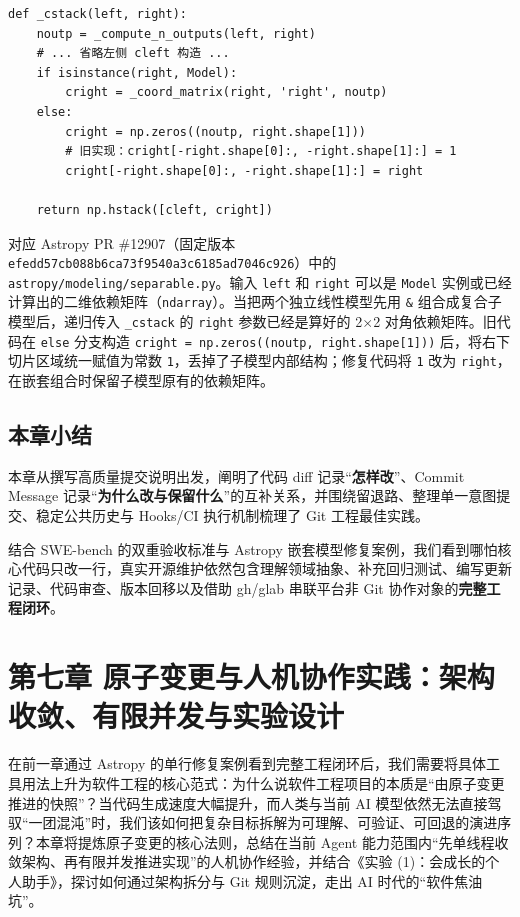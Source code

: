 \documentclass[UTF8,a4paper,11pt,fontset=fandol]{ctexart}
\begin{document}
\begin{lstlisting}[basicstyle={\ttfamily\small\linespread{1}\selectfont},captionpos=t,caption={Astropy 嵌套复合模型依赖矩阵修复对比（PR \#12907）}]
def _cstack(left, right):
    noutp = _compute_n_outputs(left, right)
    # ... 省略左侧 cleft 构造 ...
    if isinstance(right, Model):
        cright = _coord_matrix(right, 'right', noutp)
    else:
        cright = np.zeros((noutp, right.shape[1]))
        # 旧实现：cright[-right.shape[0]:, -right.shape[1]:] = 1
        cright[-right.shape[0]:, -right.shape[1]:] = right

    return np.hstack([cleft, cright])
\end{lstlisting}

对应 Astropy PR \#12907（固定版本 \texttt{efedd57cb088b6ca73f9540a3c6185ad7046c926}）中的 \texttt{astropy/modeling/separable.py}。输入 \texttt{left} 和 \texttt{right} 可以是 \texttt{Model} 实例或已经计算出的二维依赖矩阵（\texttt{ndarray}）。当把两个独立线性模型先用 \texttt{\&} 组合成复合子模型后，递归传入 \texttt{\_cstack} 的 \texttt{right} 参数已经是算好的 2\ensuremath{\times}2 对角依赖矩阵。旧代码在 \texttt{else} 分支构造 \texttt{cright = np.zeros((noutp, right.shape[1]))} 后，将右下切片区域统一赋值为常数 \texttt{1}，丢掉了子模型内部结构；修复代码将 \texttt{1} 改为 \texttt{right}，在嵌套组合时保留子模型原有的依赖矩阵。

\subsection{本章小结}

本章从撰写高质量提交说明出发，阐明了代码 diff 记录“\textbf{怎样改}”、Commit Message 记录“\textbf{为什么改与保留什么}”的互补关系，并围绕留退路、整理单一意图提交、稳定公共历史与 Hooks/CI 执行机制梳理了 Git 工程最佳实践。

结合 SWE-bench 的双重验收标准与 Astropy 嵌套模型修复案例，我们看到哪怕核心代码只改一行，真实开源维护依然包含理解领域抽象、补充回归测试、编写更新记录、代码审查、版本回移以及借助 gh/glab 串联平台非 Git 协作对象的\textbf{完整工程闭环}。

\section{第七章 原子变更与人机协作实践：架构收敛、有限并发与实验设计}

在前一章通过 Astropy 的单行修复案例看到完整工程闭环后，我们需要将具体工具用法上升为软件工程的核心范式：为什么说软件工程项目的本质是“由原子变更推进的快照”？当代码生成速度大幅提升，而人类与当前 AI 模型依然无法直接驾驭“一团混沌”时，我们该如何把复杂目标拆解为可理解、可验证、可回退的演进序列？本章将提炼原子变更的核心法则，总结在当前 Agent 能力范围内“先单线程收敛架构、再有限并发推进实现”的人机协作经验，并结合《实验 (1)：会成长的个人助手》，探讨如何通过架构拆分与 Git 规则沉淀，走出 AI 时代的“软件焦油坑”。
\end{document}
